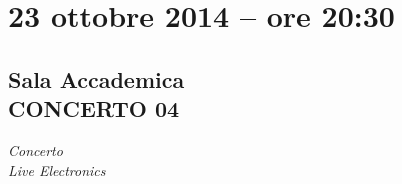 \documentclass[8pt, twoside, a5paper]{extreport}
\begin{document}
\begin{Parallel}[c]{0.47\textwidth}{0.47\textwidth}
	


	\ParallelPar
	\clearpage


\section*{23 ottobre 2014 -- ore 20:30}
\subsection*{\textsf{Sala Accademica\\
	{\small CONCERTO 04\\}}}

{\fontsize{40}{40}\selectfont \textit{Concerto\\ Live Electronics}}
\bigskip


\section*{}
	
	



\end{Parallel}
\end{document}
